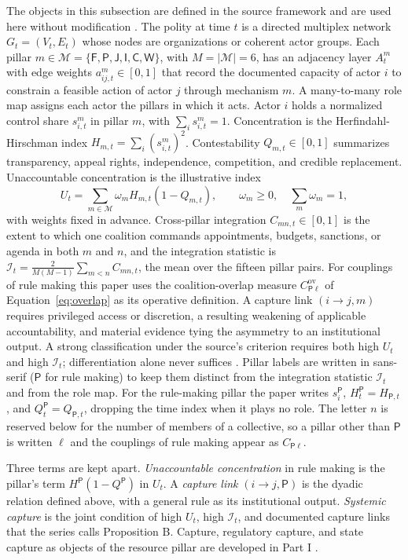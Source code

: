 \documentclass[11pt,letterpaper]{article}
\theoremstyle{definition}
\theoremstyle{remark}
\newcommand{\pF}{\mathsf{F}}
\newcommand{\pP}{\mathsf{P}}
\newcommand{\pJ}{\mathsf{J}}
\newcommand{\pI}{\mathsf{I}}
\newcommand{\pC}{\mathsf{C}}
\newcommand{\pW}{\mathsf{W}}
\newcommand{\Mset}{\mathcal{M}}
\newcommand{\Int}{\mathcal{I}}
\begin{document}
The objects in this subsection are defined in the source framework and are used here without modification \citep{largo2026hbs}. The polity at time $t$ is a directed multiplex network $G_t=(V_t,E_t)$ whose nodes are organizations or coherent actor groups. Each pillar $m\in\Mset=\{\pF,\pP,\pJ,\pI,\pC,\pW\}$, with $M=|\Mset|=6$, has an adjacency layer $A^m_t$ with edge weights $a^m_{ij,t}\in[0,1]$ that record the documented capacity of actor $i$ to constrain a feasible action of actor $j$ through mechanism $m$. A many-to-many role map assigns each actor the pillars in which it acts. Actor $i$ holds a normalized control share $s^m_{i,t}$ in pillar $m$, with $\sum_i s^m_{i,t}=1$. Concentration is the Herfindahl-Hirschman index $H_{m,t}=\sum_i (s^m_{i,t})^2$. Contestability $Q_{m,t}\in[0,1]$ summarizes transparency, appeal rights, independence, competition, and credible replacement. Unaccountable concentration is the illustrative index
\begin{equation}
U_t=\sum_{m\in\Mset}\omega_m H_{m,t}(1-Q_{m,t}),\qquad \omega_m\ge 0,\quad \sum_m\omega_m=1,
\label{eq:U}
\end{equation}
with weights fixed in advance. Cross-pillar integration $C_{mn,t}\in[0,1]$ is the extent to which one coalition commands appointments, budgets, sanctions, or agenda in both $m$ and $n$, and the integration statistic is $\Int_t=\frac{2}{M(M-1)}\sum_{m<n}C_{mn,t}$, the mean over the fifteen pillar pairs. For couplings of rule making this paper uses the coalition-overlap measure $C^{\mathrm{ov}}_{\pP\ell}$ of Equation~\eqref{eq:overlap} as its operative definition. A capture link $(i\to j,m)$ requires privileged access or discretion, a resulting weakening of applicable accountability, and material evidence tying the asymmetry to an institutional output. A strong classification under the source's criterion requires both high $U_t$ and high $\Int_t$; differentiation alone never suffices \citep[Proposition~1]{largo2026hbs}. Pillar labels are written in sans-serif ($\pP$ for rule making) to keep them distinct from the integration statistic $\Int_t$ and from the role map. For the rule-making pillar the paper writes $s^{\pP}_i$, $H^{\pP}_t=H_{\pP,t}$, and $Q^{\pP}_t=Q_{\pP,t}$, dropping the time index when it plays no role. The letter $n$ is reserved below for the number of members of a collective, so a pillar other than $\pP$ is written $\ell$ and the couplings of rule making appear as $C_{\pP\ell}$.

Three terms are kept apart. \emph{Unaccountable concentration} in rule making is the pillar's term $H^{\pP}(1-Q^{\pP})$ in $U_t$. A \emph{capture link} $(i\to j,\pP)$ is the dyadic relation defined above, with a general rule as its institutional output. \emph{Systemic capture} is the joint condition of high $U_t$, high $\Int_t$, and documented capture links that the series calls Proposition B. Capture, regulatory capture, and state capture as objects of the resource pillar are developed in Part I \citep[Sections~4 and~6]{long2026financial}.
\end{document}
